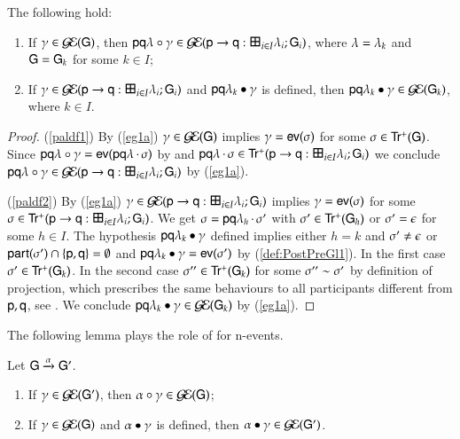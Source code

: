 \begin{lemma}\label{paldf}
 The following hold: \\[-10pt]
\begin{enumerate}
\item\label{paldf1} If $\gamma\in\mathcal{G\!E}( {\sf G})$, then $\preG\comocc{\Comm\pp{\la}\q}\in \EGG( \gt\pp\q i I \la \G)$, where $\lambda=\lambda_k$ and ${\sf G}={\sf G}_k$ for some $k\in I$;
\item\label{paldf2} If $\comocc\in\EGG( \gt\pp\q i I \la \G)$ and ${{\sf p}{\sf q}\lambda_k}\bullet{\ensuremath{\gamma}}$ is defined, then ${{\sf p}{\sf q}\lambda_k}\bullet{\ensuremath{\gamma}}\in\mathcal{G\!E}( {\sf G}_k)$, where $k\in I$.
\end{enumerate}
\end{lemma}
\begin{proof}
(\ref{paldf1}) By (\ref{eg1a}) $\gamma\in\mathcal{G\!E}( {\sf G})$ implies $\gamma={\sf ev}(\sigma)$ for some $\sigma\in{\sf Tr^+}({\sf G})$. Since ${{\sf p}{\sf q}\lambda}\circ{\ensuremath{\gamma}}={\sf ev}({\sf p}{\sf q}\lambda\,{\cdot}\,\sigma)$ by  and $\concat{\Comm\pp{\la}\q}\comseq\in\FPaths{ \gt\pp\q i I \la \G}$ we conclude $\preG\comocc{\Comm\pp{\la}\q}\in \EGG( \gt\pp\q i I \la \G)$ by (\ref{eg1a}).

(\ref{paldf2}) By (\ref{eg1a}) $\comocc\in\EGG( \gt\pp\q i I \la \G)$ implies $\gamma={\sf ev}(\sigma)$ for some $\comseq\in\FPaths{\gt\pp\q i I \la \G}$. We get $\sigma={\sf p}{\sf q}\lambda_h\,{\cdot}\,\sigma'$ with $\sigma'\in{\sf Tr^+}({\sf G}_h)$ or $\sigma'=\epsilon$ for some $h\in I$. The hypothesis ${{\sf p}{\sf q}\lambda_k}\bullet{\ensuremath{\gamma}}$ defined implies either $h=k$ and $\sigma'\not=\epsilon$ or ${\sf part}(\sigma')\cap\{{\sf p},{\sf q}\}=\emptyset$ and ${{\sf p}{\sf q}\lambda_k}\bullet{\ensuremath{\gamma}}={\sf ev}(\sigma')$ by (\ref{def:PostPreGl1}). In the first case $\sigma'\in{\sf Tr^+}({\sf G}_k)$.
In the second case $\sigma''\in{\sf Tr^+}({\sf G}_k)$ for some $\sigma''\sim\sigma'$ by definition of projection,  which prescribes the same behaviours to all participants different from ${\sf p},{\sf q}$,  see . We conclude  ${{\sf p}{\sf q}\lambda_k}\bullet{\ensuremath{\gamma}}\in\mathcal{G\!E}( {\sf G}_k)$ by (\ref{eg1a}).
\end{proof}

 
The following lemma %
plays the role  %
of   for n-events.

  
\begin{lemma}\label{paltr}
Let ${\sf G}\xrightarrow{\alpha} {\sf G}'$.
\begin{enumerate}
\item\label{paltr1} If $\gamma\in\mathcal{G\!E}({\sf G}')$, then ${\alpha}\circ{\ensuremath{\gamma}}\in \mathcal{G\!E}({\sf G})$;
\item\label{paltr2} If $\gamma\in\mathcal{G\!E}({\sf G})$ and ${\alpha}\bullet{\ensuremath{\gamma}}$ is defined, then ${\alpha}\bullet{\ensuremath{\gamma}}\in\mathcal{G\!E}( {\sf G}')$.
\end{enumerate}
\end{lemma}



